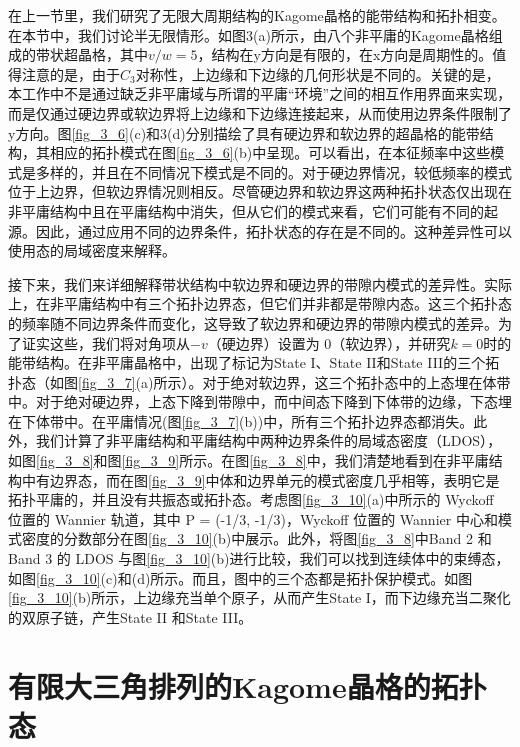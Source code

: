 在上一节里，我们研究了无限大周期结构的Kagome晶格的能带结构和拓扑相变。在本节中，我们讨论半无限情形。如图3(a)所示，由八个非平庸的Kagome晶格组成的带状超晶格，其中$v/w = 5$，结构在y方向是有限的，在x方向是周期性的。值得注意的是，由于$C_3$对称性，上边缘和下边缘的几何形状是不同的\cite{C3-4}。关键的是，本工作中不是通过缺乏非平庸域与所谓的平庸“环境”之间的相互作用界面来实现，而是仅通过硬边界或软边界将上边缘和下边缘连接起来，从而使用边界条件限制了y方向。图\ref{fig_3_6}(c)和3(d)分别描绘了具有硬边界和软边界的超晶格的能带结构，其相应的拓扑模式在图\ref{fig_3_6}(b)中呈现。可以看出，在本征频率中这些模式是多样的，并且在不同情况下模式是不同的。对于硬边界情况，较低频率的模式位于上边界，但软边界情况则相反。尽管硬边界和软边界这两种拓扑状态仅出现在非平庸结构中且在平庸结构中消失，但从它们的模式来看，它们可能有不同的起源。因此，通过应用不同的边界条件，拓扑状态的存在是不同的。这种差异性可以使用态的局域密度\cite{C3-5}来解释。

接下来，我们来详细解释带状结构中软边界和硬边界的带隙内模式的差异性。实际上，在非平庸结构中有三个拓扑边界态，但它们并非都是带隙内态。这三个拓扑态的频率随不同边界条件而变化，这导致了软边界和硬边界的带隙内模式的差异。为了证实这些，我们将对角项从$-v$（硬边界）设置为 0（软边界），并研究$ k = 0 $时的能带结构。在非平庸晶格中，出现了标记为State I、State II和State III的三个拓扑态（如图\ref{fig_3_7}(a)所示）。对于绝对软边界，这三个拓扑态中的上态埋在体带中。对于绝对硬边界，上态下降到带隙中，而中间态下降到下体带的边缘，下态埋在下体带中。在平庸情况(图\ref{fig_3_7}(b))中，所有三个拓扑边界态都消失。此外，我们计算了非平庸结构和平庸结构中两种边界条件的局域态密度（LDOS）\cite{C3-5}，如图\ref{fig_3_8}和图\ref{fig_3_9}所示。在图\ref{fig_3_8}中，我们清楚地看到在非平庸结构中有边界态，而在图\ref{fig_3_9}中体和边界单元的模式密度几乎相等，表明它是拓扑平庸的，并且没有共振态或拓扑态。考虑图\ref{fig_3_10}(a)中所示的 Wyckoff 位置的 Wannier 轨道，其中 P = (-1/3, -1/3)，Wyckoff 位置的 Wannier 中心和模式密度的分数部分在图\ref{fig_3_10}(b)中展示。此外，将图\ref{fig_3_8}中Band 2 和Band 3 的 LDOS 与图\ref{fig_3_10}(b)进行比较，我们可以找到连续体中的束缚态，如图\ref{fig_3_10}(c)和(d)所示。而且，图中的三个态都是拓扑保护模式。如图\ref{fig_3_10}(b)所示，上边缘充当单个原子，从而产生State I，而下边缘充当二聚化的双原子链，产生State II 和State III。

\section{有限大三角排列的Kagome晶格的拓扑态}

